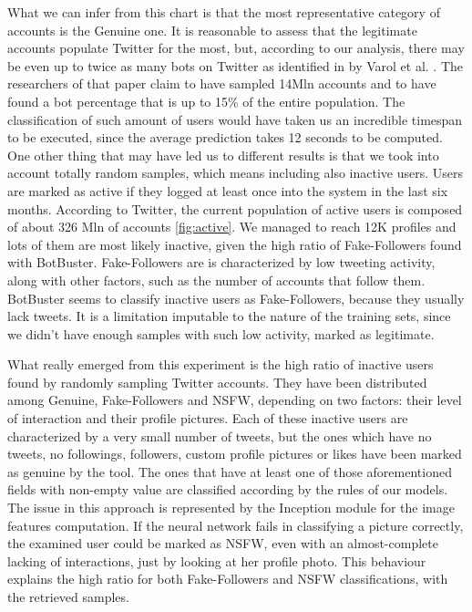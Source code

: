 What we can infer from this chart is that the most representative category of accounts is the Genuine one.
It is reasonable to assess that the legitimate accounts populate Twitter for the most, but, according to our analysis, there may be even up to twice as many bots on Twitter as identified in by Varol et al. \cite{Varol}. The researchers of that paper claim to have sampled 14Mln accounts and to have found a bot percentage that is up to 15\% of the entire population.
The classification of such amount of users would have taken us an incredible timespan to be executed, since the average prediction takes 12 seconds to be computed.
One other thing that may have led us to different results is that we took into account totally random samples, which means including also inactive users.
Users are marked as active if they logged at least once into the system in the last six months. According to Twitter, the current population of active users is composed of about 326 Mln of accounts \ref{fig:active}. We managed to reach 12K profiles and lots of them are most likely inactive, given the high ratio of Fake-Followers found with BotBuster. Fake-Followers are is characterized by low tweeting activity, along with other factors, such as the number of accounts that follow them. BotBuster seems to classify inactive users as Fake-Followers, because they usually lack tweets. It is a limitation imputable to the nature of the training sets, since we didn't have enough samples with such low activity, marked as legitimate.

What really emerged from this experiment is the high ratio of inactive users found by randomly sampling Twitter accounts. They have been distributed among Genuine, Fake-Followers and NSFW, depending on two factors: their level of interaction and their profile pictures.
Each of these inactive users are characterized by a very small number of tweets, but the ones which have no tweets, no followings, followers, custom profile pictures or likes have been marked as genuine by the tool. The ones that have at least one of those aforementioned fields with non-empty value are classified according by the rules of our models. The issue in this approach is represented by the Inception module for the image features computation. If the neural network fails in classifying a picture correctly, the examined user could be marked as NSFW, even with an almost-complete lacking of interactions, just by looking at her profile photo. This behaviour explains the high ratio for both Fake-Followers and NSFW classifications, with the retrieved samples.

